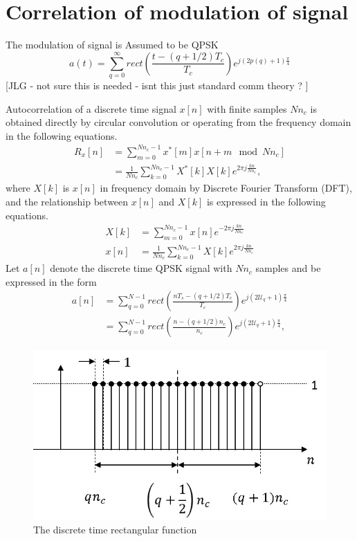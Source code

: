 \documentclass[draftcls,onecolumn]{IEEEtran}  %
\begin{document}
\section{Correlation of modulation of signal} \label{App: Ra}
The modulation of signal is Assumed to be QPSK
\begin{equation}
a(t)=\sum_{q=0}^{\infty}rect(\frac{t-(q+1/2)T_c}{T_c})e^{j(2p(q)+1)\frac{\pi}{4}}
\end{equation}
[JLG - not sure this is needed - isnt this just standard comm theory ? ]

Autocorrelation of a discrete time signal $x[n]$ with finite samples $Nn_c$ is obtained directly by circular convolution or operating from the frequency domain in the following equations.
\begin{equation}\label{Eq: Auto_corx}
\begin{split}
R_x[n] &= \sum\limits_{m=0}^{Nn_c-1} x^*[m] x[n+m \mod Nn_c] \\
	 &= \frac{1}{Nn_c}\sum\limits_{k=0}^{Nn_c-1} X^*[k]X[k] e^{2\pi j \frac{kn}{Nn_c}},
\end{split}
\end{equation}
where $X[k]$ is $x[n]$ in frequency domain by Discrete Fourier Transform (DFT), and the relationship between $x[n]$ and $X[k]$ is expressed in the following equations.
\begin{equation}\label{Eq: xn_XK}
\begin{split}
X[k] &= \sum\limits_{m=0}^{Nn_c-1} x[n] e^{-2\pi j \frac{kn}{Nn_c}} \\
x[n] &= \frac{1}{Nn_c} \sum\limits_{k=0}^{Nn_c-1} X[k] e^{2\pi j \frac{kn}{Nn_c}} 
\end{split}
\end{equation}
Let $a[n]$ denote the discrete time QPSK signal with $Nn_c$ samples and be expressed in the form
\begin{equation}\label{Eq: a_n}
\begin{split}
a[n] &= \sum\limits_{q=0}^{N-1} rect(\frac{nT_s-(q+1/2)T_c}{T_c})e^{j(2\mathcal{U}_q+1)\frac{\pi}{4}} \\ 
	 &= \sum\limits_{q=0}^{N-1} rect(\frac{n-(q+1/2)n_c}{n_c})e^{j(2\mathcal{U}_q+1)\frac{\pi}{4}},    
     \end{split}
\end{equation}
\begin{figure}[t!]
	\centering
	\includegraphics[width=3 in]{pdf/a_n.jpg}
	\caption{The discrete time rectangular function}
	\label{fig:a_n}
\end{figure}
\end{document}
